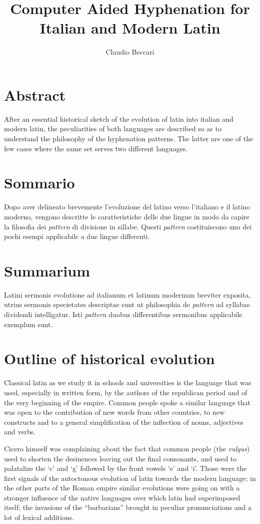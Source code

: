 \documentclass{ltugboat}
\title{Computer Aided Hyphenation for Italian and Modern Latin}
\author{Claudio Beccari}
\begin{document}
\maketitle
\section*{Abstract}
After  an essential historical sketch of the evolution of latin into italian
and modern latin, the peculiarities of both languages are described so as to
understand the philosophy of the hyphenation patterns. The latter are one of
the few cases where the same set serves two different languages.

\section*{Sommario}  Dopo  aver delineato brevemente l'evoluzione del latino
verso l'italiano e il latino moderno, vengono descritte  le  caratteristiche
delle  due  lingue  in  modo  da  capire  la  filosofia dei {\it pattern} di
divisione in sillabe. Questi  {\it  pattern}  costituiscono  uno  dei  pochi
esem\-pi applicabile a due lingue differenti.

\section*{Summarium}  
Latini sermonis evolutione ad italianum et la\-ti\-num
modernum breviter exposita,  utrius  sermonis  spe\-cie\-ta\-tes  descriptae
sunt  ut  philosophia  de  {\it pattern} ad syllabas dividendi intelligatur.
Isti {\it pattern}  duobus  differentibus  sermonibus  applicabile  exemplum
sunt.

\section{Outline of historical evolution}
Classical  latin  as we study it in schools and universities is the language
that was used, especially in written form, by the authors of the  republican
period  and  of  the  very  beginning  of  the empire. Common people spoke a
similar language that was open to the contribution of new words  from  other
countries,  to  new  constructs  and  to  a  general  simplification  of the
inflection of nouns, adjectives and verbs.

Cicero  himself  was complaining about the fact that common people (the {\it
vulgus\/}) used to shorten the desinences leaving out the final  consonants,
and  used to palatalize the `c' and `g' followed by the front vowels `e' and
`i'. Those were the first signals of  the  autoctonous  evolution  of  latin
towards  the modern language; in the other parts of the Roman empire similar
evolutions were going on with a stronger influence of the  native  languages
over    which    latin   had  superimposed  itself;  the  invasions  of  the
``barbarians'' brought in peculiar  pronunciations  and  a  lot  of  lexical
additions.
\end{document}
